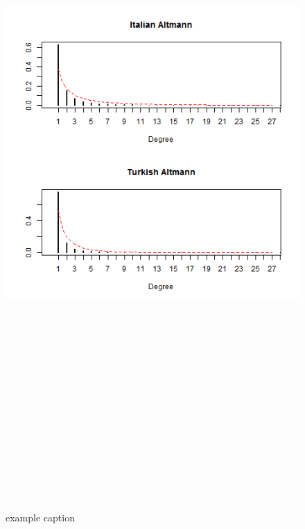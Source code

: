 \documentclass[paper=a4, fontsize=11pt]{scrartcl} %
\theoremstyle{plain}
\begin{document}
\begin{figure}[htbp] %
   \centering
   \includegraphics[width=15cm,height=27cm]{Altman_5} %
   \caption{example caption}
   \label{fig:example}
\end{figure}
\end{document}

